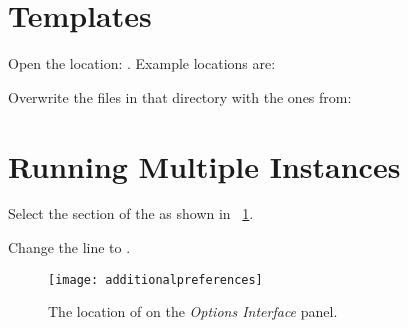 \section{Templates}
   \begin{numberedlist}
       \item Open the location: .  Example locations are:
       \begin{plainlist}
           \item {}
           \item {}
       \end{plainlist}
       \item Overwrite the files in that directory with the ones from:
       \begin{plainlist}
           \item {}
       \end{plainlist}
   \end{numberedlist}

\section{Running Multiple Instances}
\begin{numberedlist}
	\item Select the  section of the  as shown in \figurename~\ref{fig:additionalpreferences}.
	\item Change the line  to .
\end{numberedlist}
\begin{figure}
	\centering
	\texttt{[image: additionalpreferences]}
	\caption[The location of  on the \textit{Options Interface} panel]{The location of  on the \textit{Options Interface} panel.}
	\label{fig:additionalpreferences}
\end{figure}


